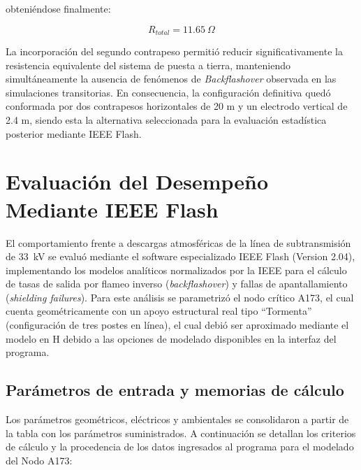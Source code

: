 \documentclass[12pt,letterpaper]{article}
\begin{document}
obteniéndose finalmente:

\begin{equation}
R_{total}=11.65\ \Omega
\end{equation}

La incorporación del segundo contrapeso permitió reducir significativamente la resistencia equivalente del sistema de puesta a tierra, manteniendo simultáneamente la ausencia de fenómenos de \textit{Backflashover} observada en las simulaciones transitorias. En consecuencia, la configuración definitiva quedó conformada por dos contrapesos horizontales de 20 m y un electrodo vertical de 2.4 m, siendo esta la alternativa seleccionada para la evaluación estadística posterior mediante IEEE Flash.



\section{Evaluación del Desempeño Mediante IEEE Flash}

El comportamiento frente a descargas atmosféricas de la línea de subtransmisión de 33~kV se evaluó mediante el software especializado IEEE Flash (Version 2.04), implementando los modelos analíticos normalizados por la IEEE para el cálculo de tasas de salida por flameo inverso (\textit{backflashover}) y fallas de apantallamiento (\textit{shielding failures}). Para este análisis se parametrizó el nodo crítico A173, el cual cuenta geométricamente con un apoyo estructural real tipo ``Tormenta'' (configuración de tres postes en línea), el cual debió ser aproximado mediante el modelo en H debido a las opciones de modelado disponibles en la interfaz del programa.

\subsection{Parámetros de entrada y memorias de cálculo}

Los parámetros geométricos, eléctricos y ambientales se consolidaron a partir de la tabla con los parámetros suministrados. A continuación se detallan los criterios de cálculo y la procedencia de los datos ingresados al programa para el modelado del Nodo A173:
\end{document}
